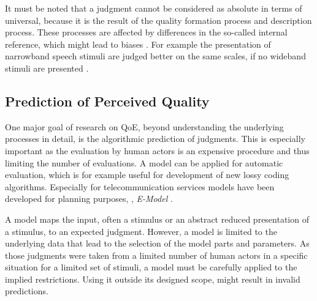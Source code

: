 It must be noted that a judgment cannot be considered as absolute in terms of universal, because it is the result of the quality formation process and description process.
These processes are affected by differences in the so-called internal reference, which might lead to biases \citep[\cf,][]{zielinski_biases_2008, pitrey_aligning_2011}.
For example the presentation of narrowband speech stimuli are judged better on the same scales, if no wideband stimuli are presented \citep[\cf,][]{koster_comparison_2015}.

\subsection{Prediction of Perceived Quality}
One major goal of research on \ac{QoE}, beyond understanding the underlying processes in detail, is the algorithmic prediction of judgments.
This is especially important as the evaluation by human actors is an expensive procedure and thus limiting the number of evaluations.
A model can be applied for automatic evaluation, which is for example useful for development of new lossy coding algorithms.
Especially for telecommunication services models have been developed for planning purposes, \eg, \emph{E-Model} \citep{itu-t_g.107:_2014}.


A model maps the input, often a stimulus or an abstract reduced presentation of a stimulus, to an expected judgment.
However, a model is limited to the underlying data that lead to the selection of the model parts and parameters.
As those judgments were taken from a limited number of human actors in a specific situation for a limited set of stimuli, a model must be carefully applied to the implied restrictions.
Using it outside its designed scope, might result in invalid predictions.
